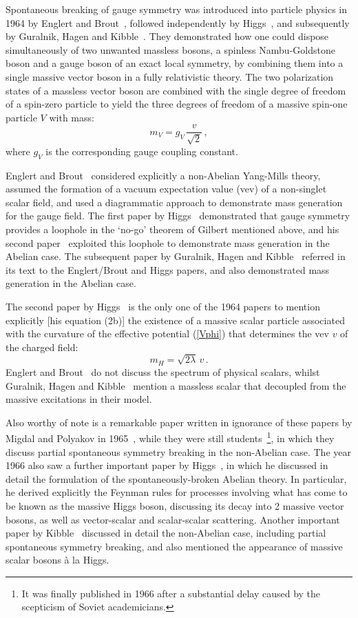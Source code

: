 \documentclass[12pt]{article}
\newcommand{\beq}{\begin{equation}}
\newcommand{\eeq}{\end{equation}}
\numberwithin{equation}{section}
\begin{document}
Spontaneous breaking of gauge symmetry was introduced into particle
physics in 1964 by Englert and Brout~\cite{EB}, followed independently
by Higgs~\cite{H1,H2}, and subsequently by Guralnik, Hagen and
Kibble~\cite{GHK}. They demonstrated how one could dispose
simultaneously of two unwanted massless bosons, a spinless Nambu-Goldstone
boson and a gauge boson of an exact local symmetry, by combining them
into a single massive vector boson in a fully relativistic theory.
The two polarization states of a massless vector boson are combined
with the single degree of freedom of a spin-zero particle to yield the
three degrees of freedom of a massive spin-one particle $V$ with mass:
%
\beq m_V = g_V \, \frac{v}{\sqrt{2}} \, ,\label{Vmass}\eeq
\noindent
where $g_V$ is the corresponding gauge coupling constant.

Englert and Brout~\cite{EB} considered explicitly a non-Abelian Yang-Mills theory, assumed the formation of a vacuum
expectation value (vev) of a non-singlet scalar field, and used a diagrammatic approach to demonstrate mass
generation for the gauge field. The first paper by Higgs~\cite{H1} demonstrated that gauge symmetry
provides a loophole in the `no-go' theorem of Gilbert mentioned above, and his second paper~\cite{H2} exploited this loophole
to demonstrate mass generation in the Abelian case. The subsequent paper 
by Guralnik, Hagen and Kibble~\cite{GHK} referred in its text to the Englert/Brout and Higgs papers, and
also demonstrated mass generation in the Abelian case.

The second paper by Higgs~\cite{H2} is the only one of the 1964 papers
to mention explicitly [his equation (2b)] the existence of a massive
scalar particle associated with the curvature of the effective
potential (\ref{Vphi}) that determines the vev $v$ of the charged field:
%
\beq m_H = \sqrt{2\lambda} \, v \, .\label{Hmass}\eeq 
\noindent
Englert and Brout~\cite{EB} do not discuss the spectrum of physical
scalars, whilst Guralnik, Hagen and Kibble~\cite{GHK} mention a
massless scalar that decoupled from the massive excitations in their
model.

Also worthy of note is a remarkable paper written in ignorance of these papers by Migdal and Polyakov in 1965~\cite{MP},
while they were still students~\footnote{It was finally published in 1966
after a substantial delay caused by the scepticism of Soviet academicians.}, in which they
discuss partial spontaneous symmetry breaking in the non-Abelian case.
The year 1966 also saw a further important paper by Higgs~\cite{H3},
in which he discussed in detail the formulation of the spontaneously-broken Abelian theory.
In particular, he derived explicitly the Feynman rules for processes involving what has come to be
known as the massive Higgs boson, discussing its decay into 2 massive vector
bosons, as well as vector-scalar and scalar-scalar scattering. Another important paper by Kibble~\cite{Kibble}
discussed in detail the non-Abelian case, including partial spontaneous symmetry
breaking, and also mentioned the appearance of massive scalar bosons
\`a la Higgs.
\end{document}
